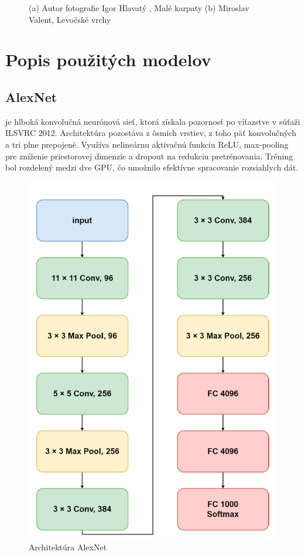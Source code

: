 \documentclass[journal,onecolumn]{IEEEtran}
\begin{document}
\begin{figure}[!htb]
    \centering
    \caption{(a) Autor fotografie Igor Hlavatý \cite{mz}, Malé karpaty (b) Miroslav Valent, Levočské vrchy \cite{mc}}
    \label{fig:foobar}
\end{figure}


\section{Popis použitých modelov}

\subsection{AlexNet}
\IEEEPARstart{}{}je hlboká konvolučná neurónová sieť, ktorá získala pozornosť po víťazstve v súťaži ILSVRC 2012. Architektúra pozostáva z ôsmich vrstiev, z toho päť konvolučných a tri plne prepojené. Využíva nelineárnu aktivačnú funkciu ReLU, max-pooling pre zníženie priestorovej dimenzie a dropout na redukciu pretrénovania. Tréning bol rozdelený medzi dve GPU, čo umožnilo efektívne spracovanie rozsiahlych dát.
\begin{figure}[!htb]
    \centering
    \includegraphics[width=0.35\linewidth]{Images/arch_alexnet.png}
    \caption{Architektúra AlexNet \cite{pc}}
    \label{fig:enter-label}
\end{figure}
\end{document}
